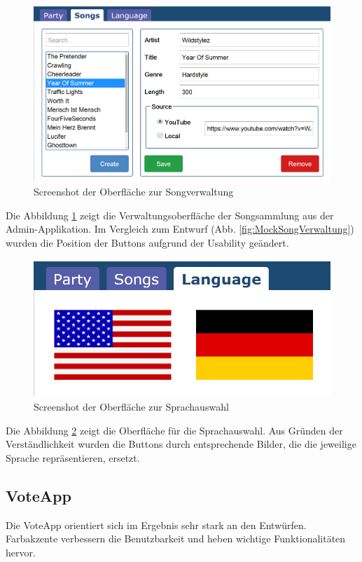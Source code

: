 \begin{figure}[H]
\centering
\includegraphics[width=0.9\linewidth]{Bilder/Screenshot-Admin-Songs}
\caption{Screenshot der Oberfläche zur Songverwaltung}
\label{fig:Screenshot-Admin-Songs}
\end{figure}

Die Abbildung \ref{fig:Screenshot-Admin-Songs} zeigt die Verwaltungsoberfläche der Songsammlung aus der Admin-Applikation. Im Vergleich zum Entwurf (Abb. \ref{fig:MockSongVerwaltung}) wurden die Position der Buttons aufgrund der Usability geändert.

\begin{figure}[H]
\centering
\includegraphics[width=0.5\linewidth]{Bilder/Screenshot-Admin-Language}
\caption{Screenshot der Oberfläche zur Sprachauswahl}
\label{fig:Screenshot-Admin-Language}
\end{figure}

Die Abbildung \ref{fig:Screenshot-Admin-Language} zeigt die Oberfläche für die Sprachauswahl. Aus Gründen der Verständlichkeit wurden die Buttons durch entsprechende Bilder, die die jeweilige Sprache repräsentieren, ersetzt.

\subsection{VoteApp}
Die VoteApp orientiert sich im Ergebnis sehr stark an den Entwürfen. Farbakzente verbessern die Benutzbarkeit und heben wichtige Funktionalitäten hervor.

